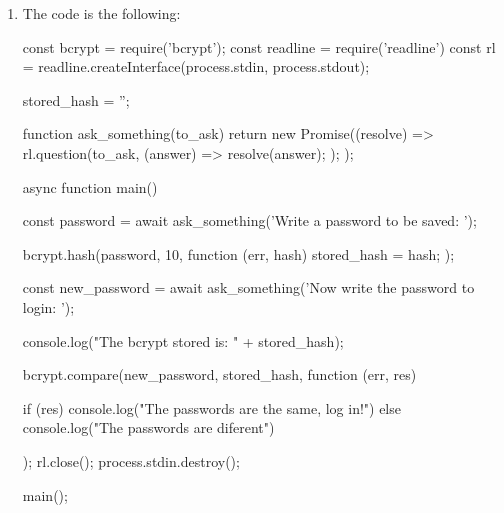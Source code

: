 \begin{Answer}[ref={basic-js-crypto-bcrypt}]
\begin{enumerate}[1.]
\item The code is the following: 

\begin{js}
const bcrypt = require('bcrypt');
const readline = require('readline')
const rl = readline.createInterface(process.stdin, process.stdout);

stored_hash = '';

function ask_something(to_ask) {
    return new Promise((resolve) => {
        rl.question(to_ask, (answer) => {
            resolve(answer);
        });
    });
}

async function main() {

    const password = await ask_something('Write a password to be saved: ');

    bcrypt.hash(password, 10, function (err, hash) {
        stored_hash = hash;
    });

    const new_password = await ask_something('Now write the password to login: ');

    console.log("The bcrypt stored is: " + stored_hash);

    bcrypt.compare(new_password, stored_hash, function (err, res) {

        if (res) {
            console.log("The passwords are the same, log in!")
        } else {
            console.log("The passwords are diferent")
        }
    });
    rl.close();
    process.stdin.destroy();
}

main();
\end{js}
\end{enumerate}
\end{Answer}
